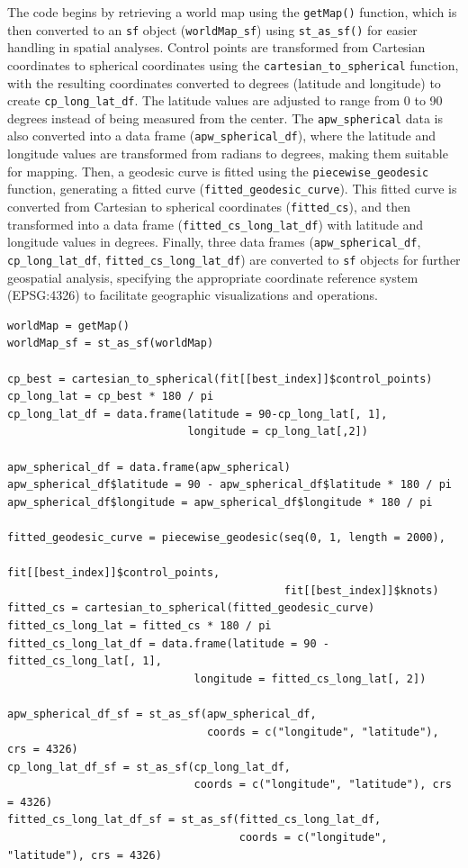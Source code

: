 The code begins by retrieving a world map using the \texttt{getMap()} function, which is then converted to an \texttt{sf} object (\texttt{worldMap\_sf}) using \texttt{st\_as\_sf()} for easier handling in spatial analyses.
Control points are transformed from Cartesian coordinates to spherical coordinates using the \texttt{cartesian\_to\_spherical} function, with the resulting coordinates converted to degrees (latitude and longitude) to create \texttt{cp\_long\_lat\_df}. The latitude values are adjusted to range from 0 to 90 degrees instead of being measured from the center.
The \texttt{apw\_spherical} data is also converted into a data frame (\texttt{apw\_spherical\_df}), where the latitude and longitude values are transformed from radians to degrees, making them suitable for mapping.
Then, a geodesic curve is fitted using the \texttt{piecewise\_geodesic} function, generating a fitted curve (\texttt{fitted\_geodesic\_curve}). This fitted curve is converted from Cartesian to spherical coordinates (\texttt{fitted\_cs}), and then transformed into a data frame (\texttt{fitted\_cs\_long\_lat\_df}) with latitude and longitude values in degrees.
Finally, three data frames (\texttt{apw\_spherical\_df}, \texttt{cp\_long\_lat\_df}, \texttt{fitted\_cs\_long\_lat\_df}) are converted to \texttt{sf} objects for further geospatial analysis, specifying the appropriate coordinate reference system (EPSG:4326) to facilitate geographic visualizations and operations.

\begin{verbatim}
worldMap = getMap()
worldMap_sf = st_as_sf(worldMap)

cp_best = cartesian_to_spherical(fit[[best_index]]$control_points)
cp_long_lat = cp_best * 180 / pi
cp_long_lat_df = data.frame(latitude = 90-cp_long_lat[, 1],
                            longitude = cp_long_lat[,2])

apw_spherical_df = data.frame(apw_spherical)
apw_spherical_df$latitude = 90 - apw_spherical_df$latitude * 180 / pi
apw_spherical_df$longitude = apw_spherical_df$longitude * 180 / pi

fitted_geodesic_curve = piecewise_geodesic(seq(0, 1, length = 2000),
                                           fit[[best_index]]$control_points,
                                           fit[[best_index]]$knots)
fitted_cs = cartesian_to_spherical(fitted_geodesic_curve)
fitted_cs_long_lat = fitted_cs * 180 / pi
fitted_cs_long_lat_df = data.frame(latitude = 90 - fitted_cs_long_lat[, 1],
                             longitude = fitted_cs_long_lat[, 2])

apw_spherical_df_sf = st_as_sf(apw_spherical_df,
                               coords = c("longitude", "latitude"), crs = 4326)
cp_long_lat_df_sf = st_as_sf(cp_long_lat_df,
                             coords = c("longitude", "latitude"), crs = 4326)
fitted_cs_long_lat_df_sf = st_as_sf(fitted_cs_long_lat_df,
                                    coords = c("longitude", "latitude"), crs = 4326)
\end{verbatim}

